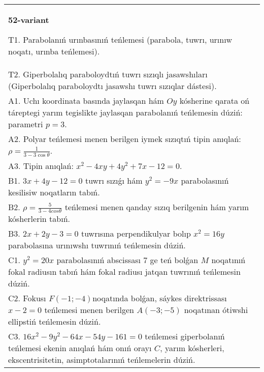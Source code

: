 \documentclass{article}
\begin{document}
\begin{tabular}{m{17cm}}
\textbf{52-variant}
\newline

T1. Parabolanıń urınbasınıń teńlemesi (parabola, tuwrı, urınıw noqatı, urınba teńlemesi).\\

T2. Giperbolalıq paraboloydtıń tuwrı sızıqlı jasawshıları (Giperbolalıq paraboloydtı jasawshı tuwrı sızıqlar dástesi).\\

A1. Uchı koordinata basında jaylasqan hám $Oy$ kósherine qarata oń táreptegi yarım tegislikte jaylasqan parabolanıń teńlemesin dúziń: parametri $p=3$.\\

A2. Polyar teńlemesi menen berilgen iymek sızıqtıń tipin anıqlań: $\rho=\frac{1}{3-3\cos\theta}$.\\

A3. Tipin anıqlań: $x^{2}-4 xy+4 y^{2}+7 x-12=0$.\\

B1. $3x + 4y - 12 = 0$ tuwrı sızıǵı hám $y^{2} = - 9x$ parabolasınıń kesilisiw noqatların tabıń.  \\

B2. $\rho = \frac{5}{3 - 4cos\theta}$ teńlemesi menen qanday sızıq berilgenin hám yarım kósherlerin tabıń.  \\

B3. $2x + 2y - 3 = 0$ tuwrısına perpendikulyar bolıp $x^{2} = 16y$ parabolasına urınıwshı tuwrınıń teńlemesin dúziń.  \\

C1. $y^{2} = 20x$ parabolasınıń abscissası 7 ge teń bolǵan $M$ noqatınıń fokal radiusın tabıń hám fokal radiusı jatqan tuwrınıń teńlemesin dúziń.  \\

C2. Fokusı $F( - 1; - 4)$noqatında bolǵan, sáykes direktrissası $x - 2 = 0$ teńlemesi menen berilgen $A( - 3; - 5)$ noqatınan ótiwshi ellipstiń teńlemesin dúziń.  \\

C3. $16x^{2} - 9y^{2} - 64x - 54y - 161 = 0$ teńlemesi giperbolanıń teńlemesi ekenin anıqlań hám onıń orayı $C$, yarım kósherleri, ekscentrisitetin, asimptotalarınıń teńlemelerin dúziń.  \\

\end{tabular}
\vspace{1cm}
\end{document}
